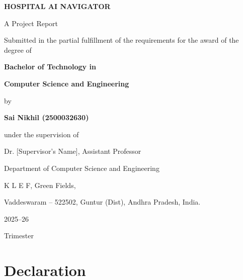 \documentclass[12pt,a4paper]{report}
\begin{document}
\begin{titlepage}
\centering


\vspace{0.5cm}

{\Huge\bfseries HOSPITAL AI NAVIGATOR\par}
\vspace{0.8cm}

{\large A Project Report\par}
\vspace{0.3cm}
{\normalsize Submitted in the partial fulfillment of the requirements for the award of the degree of\par}
\vspace{0.3cm}
{\large\bfseries Bachelor of Technology in\par}
{\large\bfseries Computer Science and Engineering\par}
\vspace{0.8cm}
{\normalsize by\par}
\vspace{0.3cm}
{\large\bfseries Sai Nikhil (2500032630)\par}
\vspace{0.8cm}
{\normalsize under the supervision of\par}
\vspace{0.2cm}
{\large Dr. [Supervisor's Name], Assistant Professor\par}
\vspace{1cm}

{\normalsize Department of Computer Science and Engineering\par}
{\normalsize K L E F, Green Fields,\par}
{\normalsize Vaddeswaram -- 522502, Guntur (Dist), Andhra Pradesh, India.\par}
\vspace{0.5cm}
{\large 2025--26\par}
{\normalsize Trimester\par}

\end{titlepage}

\newpage

\chapter*{Declaration}
\end{document}
